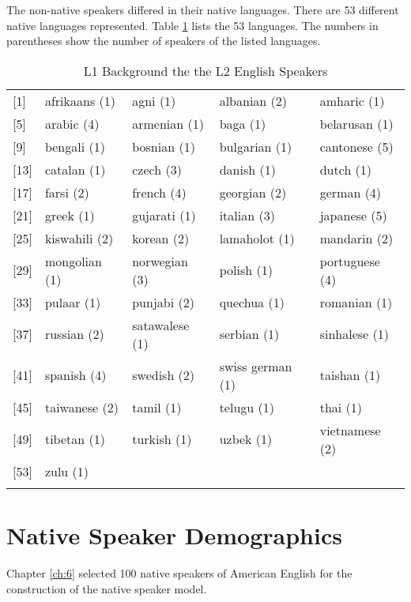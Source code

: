 The non-native speakers differed in their native languages. There are 53 different native languages represented. Table \ref{table:sd1} lists the 53 languages. The numbers in parentheses show the number of speakers of the listed languages.
\figSpace
\begin{longtable}{lllll}
\caption{L1 Background the the L2 English Speakers}\\
\hline
{[}1{]}  & afrikaans (1) & agni (1)      & albanian (2)           & amharic (1)    \\
{[}5{]}  & arabic (4)    & armenian (1)   & baga (1)               & belarusan (1)  \\
{[}9{]}  & bengali (1)   & bosnian (1)    & bulgarian (1)          & cantonese (5)  \\
{[}13{]} & catalan (1)   & czech (3)      & danish (1)             & dutch (1)      \\
{[}17{]} & farsi (2)     & french  (4)    & georgian (2)           & german (4)     \\
{[}21{]} & greek (1)     & gujarati (1)   & italian (3)            & japanese (5)   \\
{[}25{]} & kiswahili (2) & korean (2)     & lamaholot (1)          & mandarin (2)   \\
{[}29{]} & mongolian (1) & norwegian  (3) & polish (1)             & portuguese (4) \\
{[}33{]} & pulaar (1)    & punjabi (2)    & quechua (1)            & romanian (1)   \\
{[}37{]} & russian (2)   & satawalese (1) & serbian (1)            & sinhalese (1)  \\
{[}41{]} & spanish (4)   & swedish (2)    & swiss german (1) &taishan (1)            \\
{[}45{]} & taiwanese (2) & tamil (1)      & telugu (1)             & thai (1)      \\
{[}49{]} & tibetan (1)   & turkish (1)    & uzbek  (1)             & vietnamese (2) \\
{[}53{]} & zulu (1)      &            &                    &       \\
\hline    
\label{table:sd1}
\end{longtable}
\figSpace
\section{Native Speaker Demographics}
\label{dem:native}

Chapter \ref{ch:6} selected 100 native speakers of American English for the construction of the native speaker model. 

